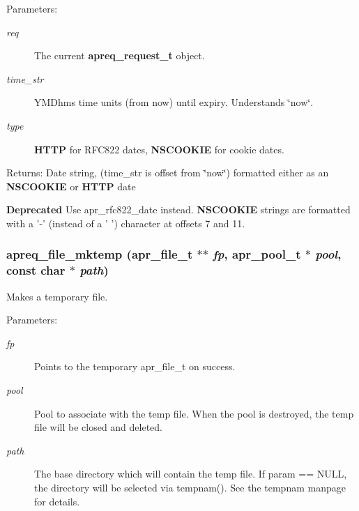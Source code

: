 \begin{Desc}
\item[Parameters:]
\begin{description}
\item[{\em req}]The current {\bf apreq\_\-request\_\-t} object. \item[{\em time\_\-str}]YMDhms time units (from now) until expiry. Understands \char`\"{}now\char`\"{}. \item[{\em type}]{\bf HTTP} for RFC822 dates, {\bf NSCOOKIE} for cookie dates. \end{description}
\end{Desc}
\begin{Desc}
\item[Returns:]Date string, (time\_\-str is offset from \char`\"{}now\char`\"{}) formatted either as an {\bf NSCOOKIE} or {\bf HTTP} date \end{Desc}


\begin{Desc}
\item[{\bf Deprecated}]Use apr\_\-rfc822\_\-date instead. {\bf NSCOOKIE} strings are formatted with a '-' (instead of a ' ') character at offsets 7 and 11. \end{Desc}
\subsubsection{ apreq\_\-file\_\-mktemp ({\bf apr\_\-file\_\-t} $\ast$$\ast$ {\em fp}, {\bf apr\_\-pool\_\-t} $\ast$ {\em pool}, const char $\ast$ {\em path})}\label{group__Utils_a19}


Makes a temporary file. \begin{Desc}
\item[Parameters:]
\begin{description}
\item[{\em fp}]Points to the temporary apr\_\-file\_\-t on success. \item[{\em pool}]Pool to associate with the temp file. When the pool is destroyed, the temp file will be closed and deleted. \item[{\em path}]The base directory which will contain the temp file. If param == NULL, the directory will be selected via tempnam(). See the tempnam manpage for details. \end{description}
\end{Desc}
